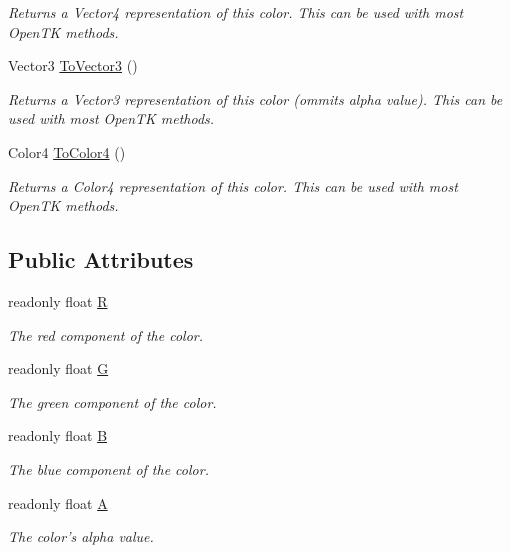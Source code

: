 \begin{DoxyCompactItemize}
\begin{DoxyCompactList}\small\item\em Returns a Vector4 representation of this color. This can be used with most Open\-T\-K methods. \end{DoxyCompactList}\item 
Vector3 \hyperlink{struct_tri_devs_1_1_tri_engine2_d_1_1_color_a0fa420642716c05e331154c47cb783e7}{To\-Vector3} ()
\begin{DoxyCompactList}\small\item\em Returns a Vector3 representation of this color (ommits alpha value). This can be used with most Open\-T\-K methods. \end{DoxyCompactList}\item 
Color4 \hyperlink{struct_tri_devs_1_1_tri_engine2_d_1_1_color_ad45f3b764582e10cb8e0e47375a6f993}{To\-Color4} ()
\begin{DoxyCompactList}\small\item\em Returns a Color4 representation of this color. This can be used with most Open\-T\-K methods. \end{DoxyCompactList}\end{DoxyCompactItemize}
\subsection*{Public Attributes}
\begin{DoxyCompactItemize}
\item 
readonly float \hyperlink{struct_tri_devs_1_1_tri_engine2_d_1_1_color_a1e20afa7351aa10c5ab4bfafcaeca021}{R}
\begin{DoxyCompactList}\small\item\em The red component of the color. \end{DoxyCompactList}\item 
readonly float \hyperlink{struct_tri_devs_1_1_tri_engine2_d_1_1_color_af8dd846268b6f84ba3f0ac0c8d26aa61}{G}
\begin{DoxyCompactList}\small\item\em The green component of the color. \end{DoxyCompactList}\item 
readonly float \hyperlink{struct_tri_devs_1_1_tri_engine2_d_1_1_color_afa0a5303b8b93c319df33909f9361e6f}{B}
\begin{DoxyCompactList}\small\item\em The blue component of the color. \end{DoxyCompactList}\item 
readonly float \hyperlink{struct_tri_devs_1_1_tri_engine2_d_1_1_color_a007b76380dbfbb6ac2be76b45e3933e8}{A}
\begin{DoxyCompactList}\small\item\em The color's alpha value. \end{DoxyCompactList}\end{DoxyCompactItemize}
